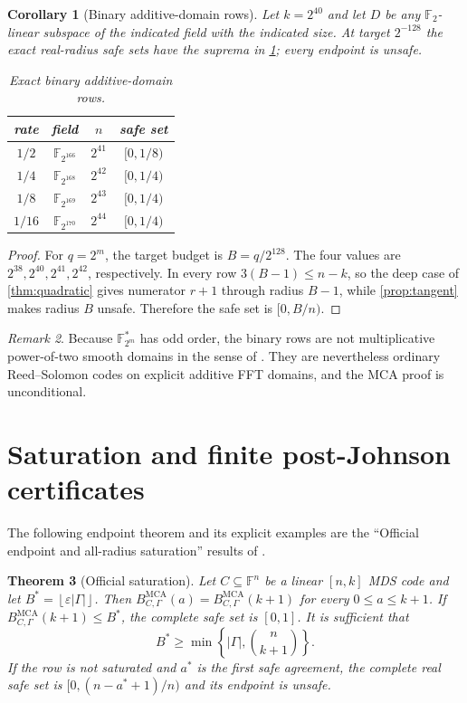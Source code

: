 \documentclass[11pt,a4paper]{amsart}
\numberwithin{equation}{section}
\newtheorem{theorem}{Theorem}[section]
\newtheorem{corollary}[theorem]{Corollary}
\theoremstyle{remark}
\newtheorem{remark}[theorem]{Remark}
\DeclareMathOperator{\MCA}{MCA}
\newcommand{\F}{\mathbb F}
\newcommand{\eps}{\varepsilon}
\newcommand{\floor}[1]{\left\lfloor#1\right\rfloor}
\begin{document}
\begin{corollary}[Binary additive-domain rows]\label{cor:binary}
Let $k=2^{40}$ and let $D$ be any $\F_2$-linear subspace of the indicated field with the indicated size.  At target $2^{-128}$ the exact real-radius safe sets have the suprema in \cref{tab:binary}; every endpoint is unsafe.

\begin{table}[ht]
\centering
\caption{Exact binary additive-domain rows.}
\label{tab:binary}
\begin{tabular}{@{}cccc@{}}
\toprule
rate & field & $n$ & safe set\\
\midrule
$1/2$  & $\F_{2^{166}}$ & $2^{41}$ & $[0,1/8)$\\
$1/4$  & $\F_{2^{168}}$ & $2^{42}$ & $[0,1/4)$\\
$1/8$  & $\F_{2^{169}}$ & $2^{43}$ & $[0,1/4)$\\
$1/16$ & $\F_{2^{170}}$ & $2^{44}$ & $[0,1/4)$\\
\bottomrule
\end{tabular}
\end{table}
\end{corollary}

\begin{proof}
For $q=2^m$, the target budget is $B=q/2^{128}$.  The four values are $2^{38},2^{40},2^{41},2^{42}$, respectively.  In every row $3(B-1)\le n-k$, so the deep case of \cref{thm:quadratic} gives numerator $r+1$ through radius $B-1$, while \cref{prop:tangent} makes radius $B$ unsafe.  Therefore the safe set is $[0,B/n)$.
\end{proof}

\begin{remark}
Because $\F_{2^m}^*$ has odd order, the binary rows are not multiplicative power-of-two smooth domains in the sense of \cite{ABF26}.  They are nevertheless ordinary Reed--Solomon codes on explicit additive FFT domains, and the MCA proof is unconditional.
\end{remark}


\section{Saturation and finite post-Johnson certificates}

The following endpoint theorem and its explicit examples are the ``Official endpoint and all-radius saturation'' results of \cite{ChoShort26}.

\begin{theorem}[Official saturation]\label{thm:saturation-official}
Let $C\subseteq\F^n$ be a linear $[n,k]$ MDS code and let $B^*=\floor{\eps|\Gamma|}$.  Then $B_{C,\Gamma}^{\MCA}(a)=B_{C,\Gamma}^{\MCA}(k+1)$ for every $0\le a\le k+1$.  If $B_{C,\Gamma}^{\MCA}(k+1)\le B^*$, the complete safe set is $[0,1]$.  It is sufficient that
\[
 B^*\ge\min\left\{|\Gamma|,\binom n{k+1}\right\}.
\]
If the row is not saturated and $a^*$ is the first safe agreement, the complete real safe set is $[0,(n-a^*+1)/n)$ and its endpoint is unsafe.
\end{theorem}
\end{document}
